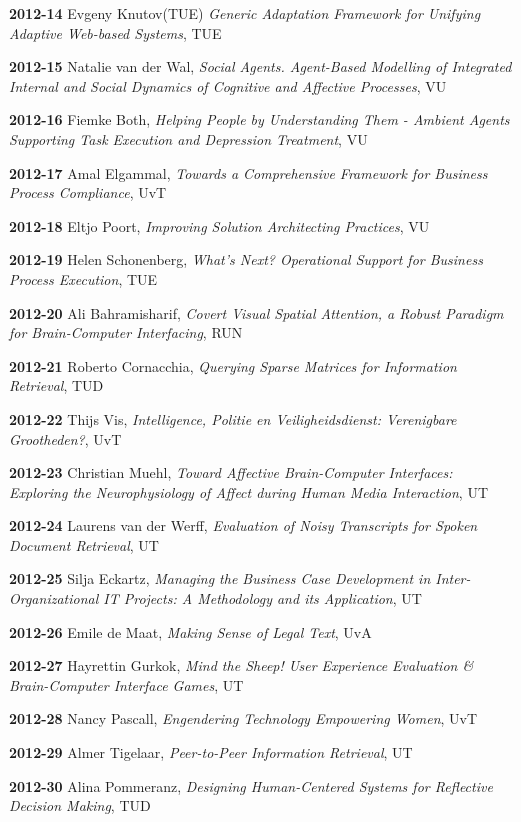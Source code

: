 \begin{multicols}{2}
\textbf{2012-14}   Evgeny Knutov(TUE) \textit{Generic Adaptation Framework for Unifying Adaptive Web-based Systems}, TUE

\textbf{2012-15}   Natalie van der Wal, \textit{Social Agents. Agent-Based Modelling of Integrated Internal and Social Dynamics of Cognitive and Affective Processes}, VU

\textbf{2012-16}   Fiemke Both, \textit{Helping People by Understanding Them - Ambient Agents Supporting Task Execution and Depression Treatment}, VU

\textbf{2012-17}   Amal Elgammal, \textit{Towards a Comprehensive Framework for Business Process Compliance}, UvT

\textbf{2012-18}   Eltjo Poort, \textit{Improving Solution Architecting Practices}, VU

\textbf{2012-19}   Helen Schonenberg, \textit{What's Next? Operational Support for Business Process Execution}, TUE

\textbf{2012-20}   Ali Bahramisharif, \textit{Covert Visual Spatial Attention, a Robust Paradigm for Brain-Computer Interfacing}, RUN

\textbf{2012-21}   Roberto Cornacchia, \textit{Querying Sparse Matrices for Information Retrieval}, TUD

\textbf{2012-22}   Thijs Vis, \textit{Intelligence, Politie en Veiligheidsdienst: Verenigbare Grootheden?}, UvT

\textbf{2012-23}   Christian Muehl, \textit{Toward Affective Brain-Computer Interfaces: Exploring the Neurophysiology of Affect during Human Media Interaction}, UT

\textbf{2012-24}   Laurens van der Werff, \textit{Evaluation of Noisy Transcripts for Spoken Document Retrieval}, UT

\textbf{2012-25}   Silja Eckartz, \textit{Managing the Business Case Development in Inter-Organizational IT Projects: A Methodology and its Application}, UT

\textbf{2012-26}   Emile de Maat, \textit{Making Sense of Legal Text}, UvA

\textbf{2012-27}   Hayrettin Gurkok, \textit{Mind the Sheep! User Experience Evaluation \& Brain-Computer Interface Games}, UT

\textbf{2012-28}   Nancy Pascall, \textit{Engendering Technology Empowering Women}, UvT

\textbf{2012-29}   Almer Tigelaar, \textit{Peer-to-Peer Information Retrieval}, UT

\textbf{2012-30}   Alina Pommeranz, \textit{Designing Human-Centered Systems for Reflective Decision Making}, TUD


\end{multicols}

